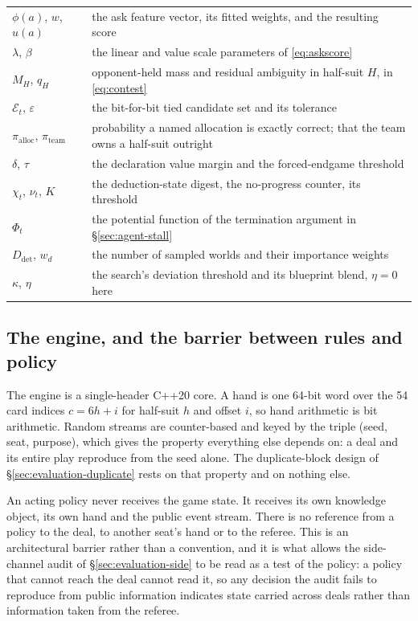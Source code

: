 \begin{table}[!t]
\begin{tabularx}{\linewidth}{@{}l L@{}}
$\phi(a)$, $w$, $u(a)$ & the ask feature vector, its fitted weights, and the resulting score \\
$\lambda$, $\beta$ & the linear and value scale parameters of \eqref{eq:askscore} \\
$M_H$, $q_H$ & opponent-held mass and residual ambiguity in half-suit $H$, in \eqref{eq:contest} \\
$\mathcal{E}_t$, $\varepsilon$ & the bit-for-bit tied candidate set and its tolerance \\
$\pi_{\mathrm{alloc}}$, $\pi_{\mathrm{team}}$ & probability a named allocation is exactly correct;
  that the team owns a half-suit outright \\
$\delta$, $\tau$ & the declaration value margin and the forced-endgame threshold \\
$\chi_t$, $\nu_t$, $K$ & the deduction-state digest, the no-progress counter, its threshold \\
$\Phi_t$ & the potential function of the termination argument in \S\ref{sec:agent-stall} \\
$D_{\mathrm{det}}$, $w_d$ & the number of sampled worlds and their importance weights \\
$\kappa$, $\eta$ & the search's deviation threshold and its blueprint blend, $\eta = 0$ here \\
\bottomrule
\end{tabularx}
\end{table}

\subsection{The engine, and the barrier between rules and policy}
\label{sec:inference-engine}

The engine is a single-header C++20 core. A hand is one 64-bit word over the 54 card indices
$c = 6h + i$ for half-suit $h$ and offset $i$, so hand arithmetic is bit arithmetic. Random streams
are counter-based and keyed by the triple (seed, seat, purpose), which gives the property everything
else depends on: a deal and its entire play reproduce from the seed alone. The duplicate-block design
of \S\ref{sec:evaluation-duplicate} rests on that property and on nothing else.

An acting policy never receives the game state. It receives its own knowledge object, its own hand
and the public event stream. There is no reference from a policy to the deal, to another seat's hand
or to the referee. This is an architectural barrier rather than a convention, and it is what allows
the side-channel audit of \S\ref{sec:evaluation-side} to be read as a test of the policy: a policy
that cannot reach the deal cannot read it, so any decision the audit fails to reproduce from public
information indicates state carried across deals rather than information taken from the referee.

